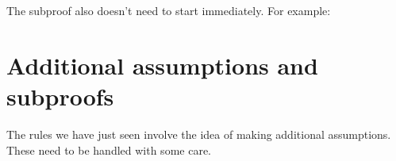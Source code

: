 The subproof also doesn't need to start immediately. For example:
\begin{fitchproof}
	\open
	\close
\end{fitchproof}
%
%
%

\section{Additional assumptions and subproofs}
The rules we have just seen involve the idea of making additional assumptions. These need to be handled with some care.


